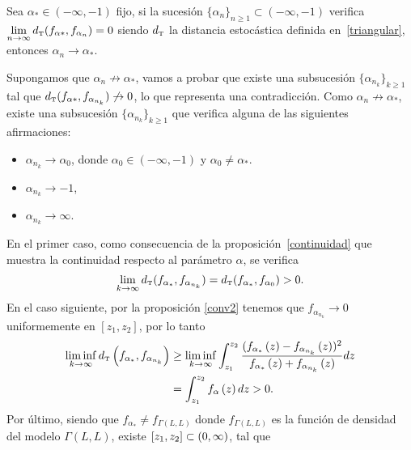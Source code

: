 \begin{proposition}
	\label{CondivParr}
	Sea $\alpha_{*} \in (-\infty,-1)$ fijo, si la sucesión $\{\alpha_{n}\}_{n \ge 1} \subset (-\infty,-1)$ verifica
	$\lim\limits_{n \to \infty} d_{\text{\tiny{T}}}(f_{\alpha*}, f_{\alpha_{n}}) = 0$ siendo $d_{\text{\tiny{T}}}$ la distancia estocástica definida en~\ref{triangular},
	entonces $\alpha_{n} \to \alpha_{*}$.
\end{proposition}
\begin{dem}
	Supongamos que $\alpha_{n} \not\to \alpha_{*}$, vamos a probar que existe una subsucesión $\{\alpha_{n_{k}}\}_{k \ge 1}$
	tal que $d_{\text{\tiny{T}}}(f_{\alpha*}, f_{\alpha_{n_{k}}}) \not\to 0$, lo que representa una contradicción.
	Como $\alpha_{n} \not\to \alpha_{*}$, existe una subsucesión $\{\alpha_{n_{k}}\}_{k \ge 1}$
	que verifica alguna de las siguientes afirmaciones:
	\begin{itemize}
		\item $\alpha_{n_{k}} \to \alpha_{0}$, donde $\alpha_{0} \in (-\infty,-1)$ y $\alpha_{0} \ne \alpha_{*}$.
		\item $\alpha_{n_{k}} \to -1$, 
		\item $\alpha_{n_{k}} \to \infty$.
	\end{itemize}
	En el primer caso, como consecuencia de la proposición~\ref{continuidad} que muestra la continuidad respecto al parámetro $\alpha$, se verifica
	\begin{align*}
	\lim_{k\to\infty} d_{\text{\tiny{T}}}(f_{\alpha_{*}}, f_{\alpha_{n_{k}}}) = d_{\text{\tiny{T}}}(f_{\alpha_{*}}, f_{\alpha_{0}}) > 0.
	\end{align*}
	En el caso siguiente, por la proposición \ref{conv2} tenemos que $f_{\alpha_{n_{k}}} \to 0$ uniformemente
	en $[z_{1},z_{2}]$, por lo tanto
	\begin{align*}
	\liminf_{k\to\infty} d_{\text{\tiny{T}}}\left( f_{\alpha_{*}}, f_{\alpha_{n_{k}}} \right) 
	& \ge \liminf_{k\to\infty}  \int_{z_{1}}^{z_{2}}\frac{(f_{\alpha_{*}}\left( z \right)-f_{\alpha_{n_{k}}}\left( z \right))^{2}}
	{f_{\alpha_{*}}\left( z \right)+f_{\alpha_{n_{k}}}\left( z \right)}dz \\
	& = \int_{z_{1}}^{z_{2}}f_{\alpha}\left( z \right)dz >0.
	\end{align*}
	Por último, siendo que $f_{\alpha_{*}}\ne f_{\Gamma(L,L)}$ donde $f_{\Gamma(L,L)}$ es la función de densidad del modelo $\Gamma(L,L)$, existe $[z_{1},z_{2}]\subset\left( 0,\infty \right)$, tal que

\end{dem}
